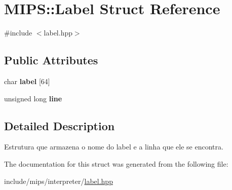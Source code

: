 \hypertarget{structMIPS_1_1Label}{}\section{M\+I\+PS\+:\+:Label Struct Reference}
\label{structMIPS_1_1Label}


{\ttfamily \#include $<$label.\+hpp$>$}

\subsection*{Public Attributes}
\begin{DoxyCompactItemize}
\item 
char {\bfseries label} \mbox{[}64\mbox{]}\hypertarget{structMIPS_1_1Label_aeb046f4a05c4ab7c02a87b49bd75de51}{}\label{structMIPS_1_1Label_aeb046f4a05c4ab7c02a87b49bd75de51}

\item 
unsigned long {\bfseries line}\hypertarget{structMIPS_1_1Label_a1e25037de487a7b1bbe4840e872024b0}{}\label{structMIPS_1_1Label_a1e25037de487a7b1bbe4840e872024b0}

\end{DoxyCompactItemize}


\subsection{Detailed Description}
Estrutura que armazena o nome do label e a linha que ele se encontra. 

The documentation for this struct was generated from the following file\+:\begin{DoxyCompactItemize}
\item 
include/mips/interpreter/\hyperlink{label_8hpp}{label.\+hpp}\end{DoxyCompactItemize}
